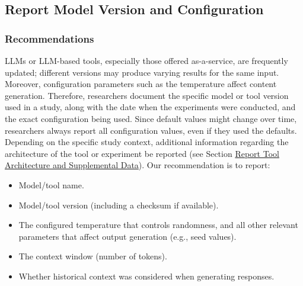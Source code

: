 



\subsection{Report Model Version and Configuration}

\subsubsection{Recommendations}

LLMs or LLM-based tools, especially those offered as-a-service, are frequently updated; different versions may produce varying results for the same input.
Moreover, configuration parameters such as the temperature affect content generation.
Therefore, researchers \must document the specific model or tool version used in a study, along with the date when the experiments were conducted, and the exact configuration being used.
Since default values might change over time, researchers \should always report all configuration values, even if they used the defaults.
Depending on the specific study context, additional information regarding the architecture of the tool or experiment \should be reported (see Section \href{/guidelines/#report-tool-architecture-and-supplemental-data}{Report Tool Architecture and Supplemental Data}).
Our recommendation is to report:

\begin{itemize}
\item Model/tool name.
\item Model/tool version (including a checksum if available).
\item The configured temperature that controls randomness, and all other relevant parameters that affect output generation (e.g., seed values).
\item The context window (number of tokens).
\item Whether historical context was considered when generating responses.
\end{itemize}


